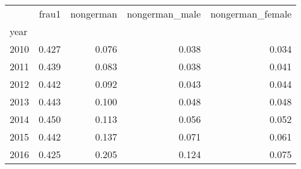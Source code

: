 \begin{tabular}{lrrrr}
\toprule
 & frau1 & nongerman & nongerman_male & nongerman_female \\
year &  &  &  &  \\
\midrule
2010 & 0.427 & 0.076 & 0.038 & 0.034 \\
2011 & 0.439 & 0.083 & 0.038 & 0.041 \\
2012 & 0.442 & 0.092 & 0.043 & 0.044 \\
2013 & 0.443 & 0.100 & 0.048 & 0.048 \\
2014 & 0.450 & 0.113 & 0.056 & 0.052 \\
2015 & 0.442 & 0.137 & 0.071 & 0.061 \\
2016 & 0.425 & 0.205 & 0.124 & 0.075 \\
\bottomrule
\end{tabular}
